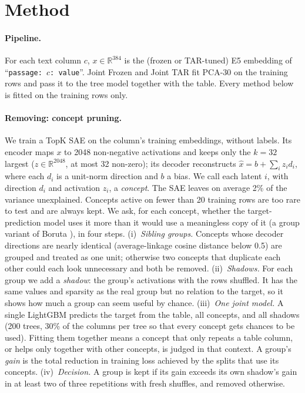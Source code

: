 \documentclass{article}
\begin{document}
\section{Method}\label{sec:method}

\paragraph{Pipeline.} For each text column $c$, $x\in\mathbb{R}^{384}$ is the (frozen or TAR-tuned) E5 embedding of
``\texttt{passage: $c$: value}''. Joint Frozen and Joint TAR fit PCA-30 on the training rows and pass it to the tree model together with the table. Every method below is fitted on the training rows only.

\paragraph{Removing: concept pruning.} We train a TopK SAE \citep{gao2024scaling} on the column's training
embeddings, without labels. Its encoder maps $x$ to 2048 non-negative activations and keeps only the $k=32$ largest
($z\in\mathbb{R}^{2048}$, at most 32 non-zero); its decoder reconstructs $\hat x = b + \sum_i z_i d_i$, where each
$d_i$ is a unit-norm direction and $b$ a bias. We call each latent $i$, with direction $d_i$ and activation $z_i$, a
\emph{concept}. The SAE leaves on average 2\% of the variance unexplained. Concepts active on fewer than 20 training rows are too rare to
test and are always kept.
We ask, for each concept, whether the target-prediction model uses it
more than it would use a meaningless copy of it (a group variant of Boruta \citep{kursa2010boruta}), in four steps.
(i)~\emph{Sibling groups.} Concepts whose decoder directions are nearly identical (average-linkage cosine distance
below 0.5) are grouped and treated as one unit; otherwise two concepts that duplicate each other could each look
unnecessary and both be removed. (ii)~\emph{Shadows.} For each group we add a \emph{shadow}: the group's activations
with the rows shuffled. It has the same values and sparsity as the real group but no relation to the target, so it
shows how much a group can seem useful by chance. (iii)~\emph{One joint model.} A single LightGBM predicts the target
from the table, all concepts, and all shadows (200 trees, 30\% of the columns per tree so that every concept gets
chances to be used). Fitting them together means a concept that only repeats a table column, or helps only together
with other concepts, is judged in that context. A group's \emph{gain} is the total reduction in training loss
achieved by the splits that use its concepts. (iv)~\emph{Decision.} A group is kept if its gain exceeds its own
shadow's gain in at least two of three repetitions with fresh shuffles, and removed otherwise.
\end{document}
